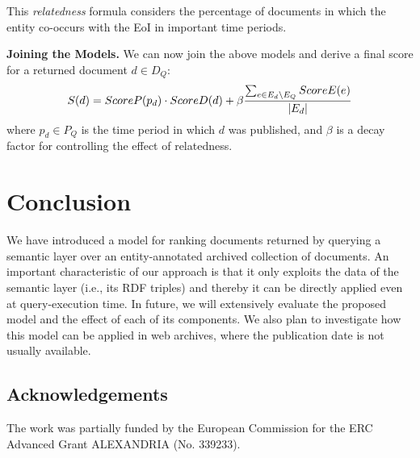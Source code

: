 \documentclass{libtex/sig-alternate-05-2015}
\begin{document}
This {\em relatedness} formula considers the percentage of
documents in which the entity
co-occurs with the EoI in important time periods.


\vspace{2mm} \noindent
{\bf Joining the Models.}
We can now join the above models and derive a final score
for a returned document $d \in D_Q$:
\begin{equation}
\small
S(d) = ScoreP(p_d) \cdot ScoreD(d) + \beta \frac{\sum_{e \in E_d \setminus E_Q}{ScoreE(e)}}{|E_d|}
\end{equation}
where $p_d \in P_Q$ is the time period in which $d$ was published,
and $\beta$ is a decay factor for controlling the effect of relatedness.



\section{Conclusion}
\label{sec:concl}

We have introduced a model for ranking
documents returned by querying
a semantic layer over an entity-annotated archived collection of documents.
An important characteristic of our approach is that
it only exploits the data of the semantic layer (i.e., its RDF triples)
and thereby it can be directly applied even at query-execution time.
In future, we will extensively evaluate the proposed model
and the effect of each of its components.
We also plan to investigate how this model
can be applied in web archives, where the
publication date is not usually available.

\subsection*{Acknowledgements}
\vspace{-1mm}
The work was partially funded by the
European Commission for the ERC Advanced Grant ALEXANDRIA (No. 339233).




\end{document}
